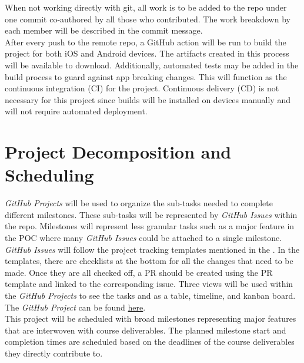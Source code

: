 \documentclass{article}
\begin{document}
When not working directly with git, all work is to be added to the repo under one commit co-authored by all those who contributed. The work breakdown by each member will be described in the commit message. \\

After every push to the remote repo, a GitHub action will be run to build the project for both iOS and Android devices. The artifacts created in this process will be available to download. Additionally, automated tests may be added in the build process to guard against app breaking changes. This will function as the continuous integration (CI) for the project. Continuous delivery (CD) is not necessary for this project since builds will be installed on devices manually and will not require automated deployment. 

\section{Project Decomposition and Scheduling} \label{project_decomposition_and_scheduling}

\textit{GitHub Projects} will be used to organize the sub-tasks needed to complete different milestones. These sub-tasks will be represented by \textit{GitHub Issues} within the repo. Milestones will represent less granular tasks such as a major feature in the POC where many \textit{GitHub Issues} could be attached to a single milestone. \textit{GitHub Issues} will follow the project tracking templates mentioned in the . In the templates, there are checklists at the bottom for all the changes that need to be made. Once they are all checked off, a PR should be created using the PR template and linked to the corresponding issue. Three views will be used within the \textit{GitHub Projects} to see the tasks and as a table, timeline, and kanban board. \\

The \textit{GitHub Project} can be found \href{ https://github.com/users/russellrd/projects/2}{here}. \\

This project will be scheduled with broad milestones representing major features that are interwoven with course deliverables. The planned milestone start and completion times are scheduled based on the deadlines of the course deliverables they directly contribute to. \\

\end{document}
